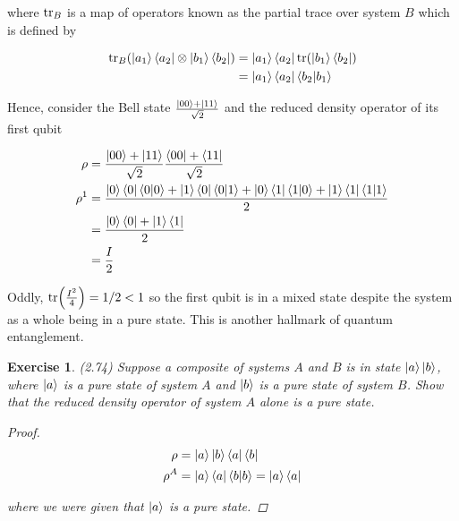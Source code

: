 \documentclass[11pt]{article}
\newcommand\0{\mathbf{0}}
\newcommand\<{\langle}
\renewcommand\>{\rangle}
\newtheorem{exercise}[theorem]{Exercise}
\begin{document}
where $\tr_B$ is a map of operators known as the partial trace over system $B$ which is defined by

\begin{align*}
\tr_B(\ket{a_1}\bra{a_2} \otimes \ket{b_1}\bra{b_2}) &= \ket{a_1}\bra{a_2} \tr( \ket{b_1}\bra{b_2}) \\
&= \ket{a_1}\bra{a_2} \bra{b_2}\ket{b_1}
\end{align*}

Hence, consider the Bell state $\frac{\ket{00} + \ket{11}}{\sqrt{2}}$ and the reduced density operator of its first qubit

\begin{align*}
\rho &= \frac{\ket{00} + \ket{11}}{\sqrt{2}}\frac{\bra{00} + \bra{11}}{\sqrt{2}} \\
\rho^1 &= \frac{\ket{0}\bra{0}\bra{0}\ket{0}+\ket{1}\bra{0}\bra{0}\ket{1}+ \ket{0}\bra{1}\bra{1}\ket{0}+ \ket{1}\bra{1}\bra{1}\ket{1}}{2} \\
&= \frac{\ket{0}\bra{0} + \ket{1}\bra{1}}{2} \\
&= \frac{I}{2}
\end{align*}

Oddly, $\tr(\frac{I^2}{4}) = 1/2 < 1$ so the first qubit is in a mixed state despite the system as a whole being in a pure state. This is another hallmark of quantum entanglement. 

\begin{exercise}
(2.74) Suppose a composite of systems $A$ and $B$ is in state $\ket{a}\ket{b}$, where $\ket{a}$ is a pure state of system $A$ and $\ket{b}$ is a pure state of system $B$. Show that the reduced density operator of system $A$ alone is a pure state.
\begin{proof}
\begin{align*}
\rho &= \ket{a}\ket{b}\bra{a}\bra{b} \\
\rho^A &= \ket{a}\bra{a}\bra{b}\ket{b} = \ket{a}\bra{a}
\end{align*}

where we were given that $\ket{a}$ is a pure state.
\end{proof}	
\end{exercise}
\end{document}
